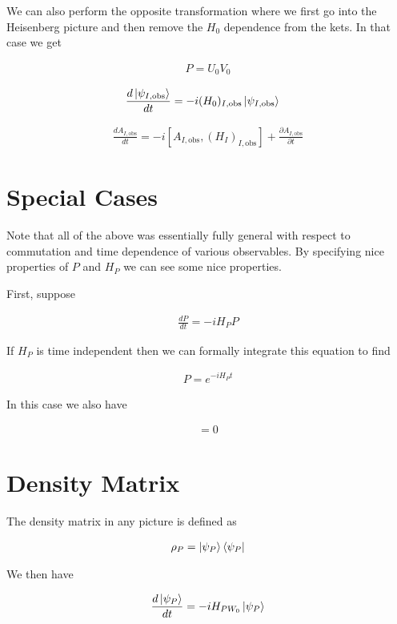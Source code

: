 \documentclass[12pt]{article}
\newcommand{\ddt}[1]{\frac{d #1}{dt}}
\newcommand{\ppt}[1]{\frac{\partial #1}{\partial t}}
\begin{document}
We can also perform the opposite transformation where we first go into the Heisenberg picture and then remove the $H_0$ dependence from the kets. In that case we get

\begin{align}
P = U_0 V_0
\end{align}

\begin{align}
\ddt{\ket{\psi_{I,\text{obs}}}} &= -i (H_0)_{I,\text{obs}} \ket{\psi_{I,\text{obs}}}
\end{align}

\begin{align}
\ddt{A_{I,\text{obs}}} = -i[A_{I,\text{obs}}, (H_I)_{I,\text{obs}} ] + \ppt{A_{I,\text{obs}}}
\end{align}

\section{Special Cases}

Note that all of the above was essentially fully general with respect to commutation and time dependence of various observables. By specifying nice properties of $P$ and $H_P$ we can see some nice properties.

First, suppose 

\begin{align}
\ddt{P} = -iH_P P
\end{align}

If $H_P$ is time independent then we can formally integrate this equation to find

\begin{align}
P = e^{-iH_P t}
\end{align}

In this case we also have

\begin{align}
[H_P,P] = 0
\end{align}

\section{Density Matrix}

The density matrix in any picture is defined as

\begin{align}
\rho_P = \ket{\psi_P}\bra{\psi_P}	
\end{align}

We then have

\begin{align}
\ddt{\ket{\psi_P}} = -iH_{PW_0} \ket{\psi_P}
\end{align}
\end{document}

